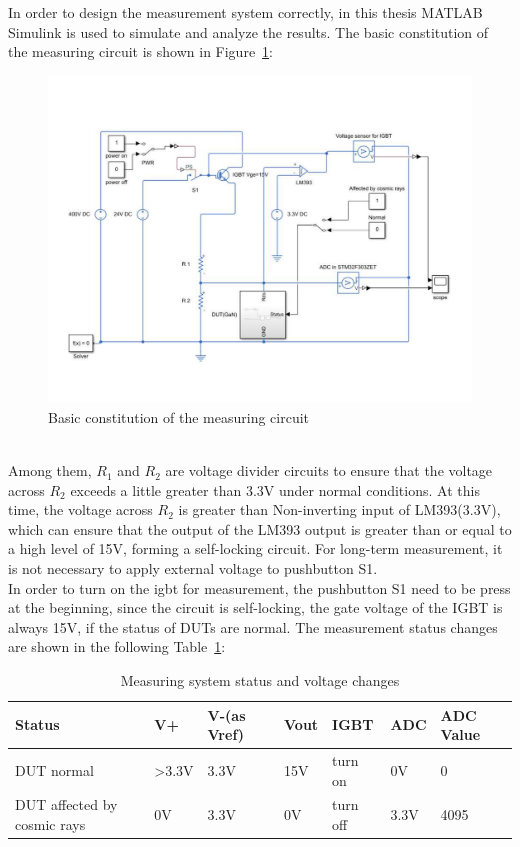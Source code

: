 In order to design the measurement system correctly, in this thesis MATLAB Simulink is used to simulate and analyze the results.
The basic constitution of the measuring circuit is shown in Figure~\ref{fig:3.3}:
\begin{figure}[!ht]
	\centering
	\includegraphics[width=17cm]{grafiken/3.3.pdf}
	\caption{Basic constitution of the measuring circuit} 
	\label{fig:3.3}
\end{figure}
\FloatBarrier
\\
Among them, $R_{1}$ and $R_{2}$ are voltage divider circuits to ensure that the voltage across $R_{2}$ exceeds a little greater than 3.3V under normal conditions. At this time, the voltage across $R_{2}$ is greater than Non-inverting input of LM393(3.3V), which can ensure that the output of the LM393 output is greater than or equal to a high level of 15V, forming a self-locking circuit. For long-term measurement, it is not necessary to apply external voltage to pushbutton S1.
\\
In order to turn on the igbt for measurement, the pushbutton S1 need to be press 
at the beginning, since the circuit is self-locking, the gate voltage of the IGBT is always 15V, if the status of DUTs are normal. The measurement
status changes are shown in the following Table~\ref{tab:3.1}:
 
\begin{table}[]
\begin{tabular}{@{}|l|l|l|l|l|l|l|@{}}
\toprule
\rowcolor[HTML]{EFEFEF} 
Status                      & V+ & V-(as Vref) & Vout & IGBT     & ADC  & ADC Value \\ \midrule
DUT normal                  & >3.3V & 3.3V       & 15V  & turn on  & 0V   & 0         \\ \midrule
DUT affected by cosmic rays & 0V & 3.3V        & 0V   & turn off & 3.3V & 4095      \\ \bottomrule
\end{tabular}
	\caption{Measuring system status and voltage changes}
	\label{tab:3.1}
\end{table}

